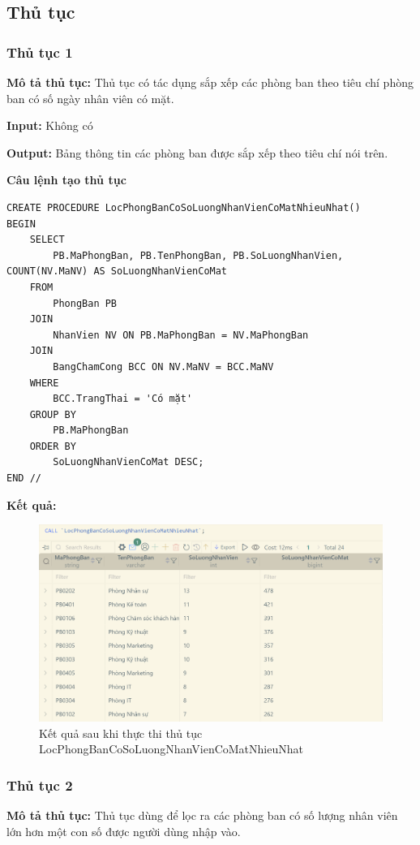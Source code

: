 \subsection{Thủ tục}
\subsubsection{Thủ tục 1}
\textbf{Mô tả thủ tục:} Thủ tục có tác dụng sắp xếp các phòng ban theo tiêu chí phòng ban có số ngày nhân viên có mặt.

\textbf{Input:} Không có

\textbf{Output:} Bảng thông tin các phòng ban được sắp xếp theo tiêu chí nói trên.

\textbf{Câu lệnh tạo thủ tục}
\begin{verbatim}
CREATE PROCEDURE LocPhongBanCoSoLuongNhanVienCoMatNhieuNhat()
BEGIN
    SELECT 
        PB.MaPhongBan, PB.TenPhongBan, PB.SoLuongNhanVien, COUNT(NV.MaNV) AS SoLuongNhanVienCoMat
    FROM 
        PhongBan PB
    JOIN 
        NhanVien NV ON PB.MaPhongBan = NV.MaPhongBan
    JOIN 
        BangChamCong BCC ON NV.MaNV = BCC.MaNV
    WHERE 
        BCC.TrangThai = 'Có mặt'
    GROUP BY 
        PB.MaPhongBan
    ORDER BY 
        SoLuongNhanVienCoMat DESC;
END //
\end{verbatim}

\textbf{Kết quả:} 
\begin{figure}[H]
    \centering
    \includegraphics[width=0.8\linewidth]{content/images/procedure_1.png}
    \caption{Kết quả sau khi thực thi thủ tục LocPhongBanCoSoLuongNhanVienCoMatNhieuNhat}
    \label{fig:procedure_1}
\end{figure}

\newpage
\subsubsection{Thủ tục 2}
\textbf{Mô tả thủ tục:} Thủ tục dùng để lọc ra các phòng ban có số lượng nhân viên lớn hơn một con số được người dùng nhập vào.

